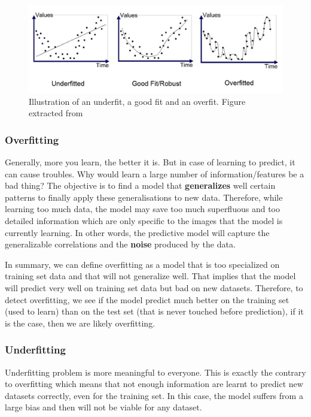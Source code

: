 \documentclass[11pt, openany]{report}
\theoremstyle{plain}
\theoremstyle{definition}
\theoremstyle{remark}
\begin{document}
\begin{figure}[h]
  \centering
  \includegraphics[scale=0.35]{figures/over-under-fit.png}
  \caption{Illustration of an underfit, a good fit and an overfit. Figure extracted from \cite{over-under-fit-schema} }
  \label{fig:over-under-fit}
\end{figure}

\subsubsection{Overfitting}
Generally, more you learn, the better it is. But in case of learning to predict, it can cause troubles. Why would learn a large number of information/features be a bad thing? 
The objective is to find a model that \textbf{generalizes} well certain patterns to finally apply these generalisations to new data. Therefore, while learning too much data, the model may save too much superfluous and too detailed information which are only specific to the images that the model is currently learning. In other words, the predictive model will capture the generalizable correlations and the \textbf{noise} produced by the data.

In summary, we can define overfitting as a model that is too specialized on training set data and that will not generalize well. That implies that the model will predict very well on training set data but bad on new datasets. Therefore, to detect overfitting, we see if the model predict much better on the training set (used to learn) than on the test set (that is never touched before prediction), if it is the case, then we are likely overfitting.


\subsubsection{Underfitting}
Underfitting problem is more meaningful to everyone. This is exactly the contrary to overfitting which means that not enough information are learnt to predict new datasets correctly, even for the training set. In this case, the model suffers from a large bias and then will not be viable for any dataset. 
\end{document}
